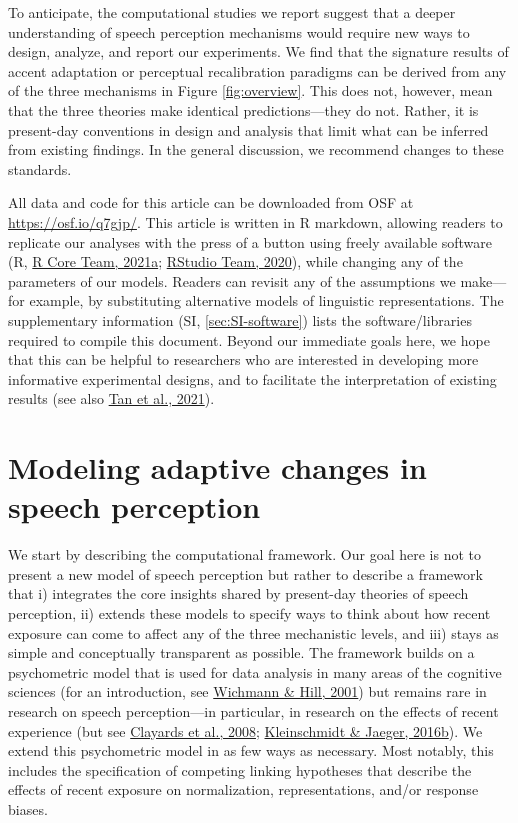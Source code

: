 \documentclass[
  11pt,
  english,
  man,floatsintext]{apa6}
\begin{document}
To anticipate, the computational studies we report suggest that a deeper understanding of speech perception mechanisms would require new ways to design, analyze, and report our experiments. We find that the signature results of accent adaptation or perceptual recalibration paradigms can be derived from any of the three mechanisms in Figure \ref{fig:overview}. This does not, however, mean that the three theories make identical predictions---they do not. Rather, it is present-day conventions in design and analysis that limit what can be inferred from existing findings. In the general discussion, we recommend changes to these standards.

All data and code for this article can be downloaded from OSF at \url{https://osf.io/q7gjp/}. This article is written in R markdown, allowing readers to replicate our analyses with the press of a button using freely available software (R, \protect\hyperlink{ref-R}{R Core Team, 2021a}; \protect\hyperlink{ref-RStudio}{RStudio Team, 2020}), while changing any of the parameters of our models. Readers can revisit any of the assumptions we make---for example, by substituting alternative models of linguistic representations. The supplementary information (SI, \ref{sec:SI-software}) lists the software/libraries required to compile this document. Beyond our immediate goals here, we hope that this can be helpful to researchers who are interested in developing more informative experimental designs, and to facilitate the interpretation of existing results (see also \protect\hyperlink{ref-tan2021}{Tan et al., 2021}).

\hypertarget{sec:framework}{%
\section{Modeling adaptive changes in speech perception}\label{sec:framework}}

We start by describing the computational framework. Our goal here is not to present a new model of speech perception but rather to describe a framework that i) integrates the core insights shared by present-day theories of speech perception, ii) extends these models to specify ways to think about how recent exposure can come to affect any of the three mechanistic levels, and iii) stays as simple and conceptually transparent as possible. The framework builds on a psychometric model that is used for data analysis in many areas of the cognitive sciences (for an introduction, see \protect\hyperlink{ref-wichmann-hill2001}{Wichmann \& Hill, 2001}) but remains rare in research on speech perception---in particular, in research on the effects of recent experience (but see \protect\hyperlink{ref-clayards2008}{Clayards et al., 2008}; \protect\hyperlink{ref-kleinschmidt-jaeger2016cogsci}{Kleinschmidt \& Jaeger, 2016b}). We extend this psychometric model in as few ways as necessary. Most notably, this includes the specification of competing linking hypotheses that describe the effects of recent exposure on normalization, representations, and/or response biases.
\end{document}
